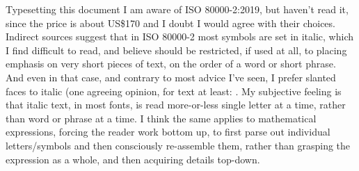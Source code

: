 \begin{plSection}{Typesetting this document}
I am aware of ISO 80000-2:2019, but haven't read it,
since the price is about US\$170 and I doubt I would agree with
their choices. Indirect sources suggest that in ISO 80000-2
most symbols are set in italic, which I find difficult to read,
and believe should be restricted, if used at all, to placing
emphasis on very short pieces of text, on the order of a word
or short phrase.~\cite{wiki:TypoConventionsMath}
And even in that case, and contrary to most
advice I've seen, I prefer slanted faces to italic
(one agreeing opinion, for text at least: 
.
My subjective feeling is that italic text,
in most fonts, is read more-or-less single letter at a time,
rather than word or phrase at a time. I think the same applies
to mathematical expressions, forcing the reader work bottom up,
to first parse out individual letters/symbols and then
consciously re-assemble them, rather than grasping
the expression as a whole, and then acquiring details top-down.


\vfill

\end{plSection}%
